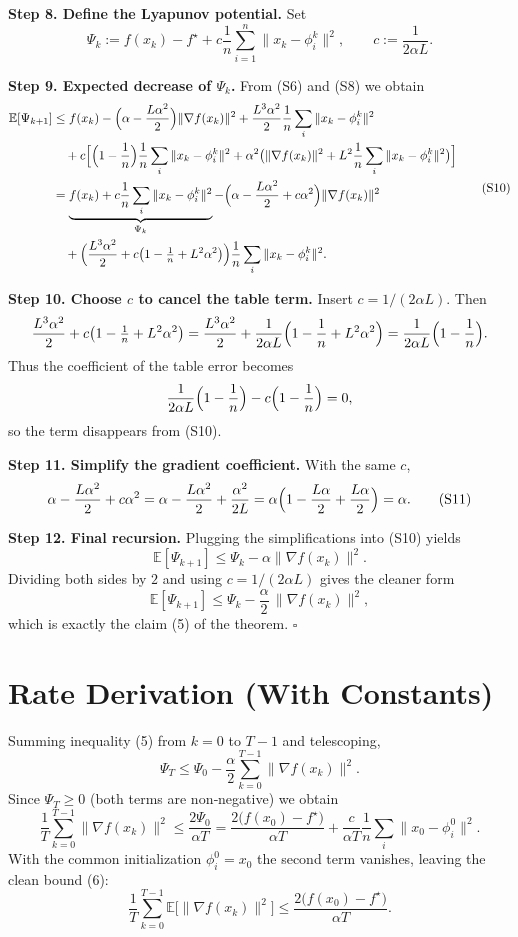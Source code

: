 \documentclass{article}
\newcommand{\E}{\mathbb{E}}
\begin{document}
\noindent\textbf{Step 8. Define the Lyapunov potential.}  
Set
\[
\Psi_k:= f(x_k)-f^{\star}
        +c\frac1n\sum_{i=1}^{n}\|x_k-\phi_i^{k}\|^{2},
\qquad c:=\frac{1}{2\alpha L}.
\tag{S9}
\]

\noindent\textbf{Step 9. Expected decrease of $\Psi_k$.}  
From (S6) and (S8) we obtain
\[
\begin{aligned}
\E[\Psi_{k+1}]
&\le f(x_k)-\Bigl(\alpha-\frac{L\alpha^{2}}{2}\Bigr)\|\nabla f(x_k)\|^{2}
   +\frac{L^{3}\alpha^{2}}{2}\frac1n\sum_{i}\|x_k-\phi_i^{k}\|^{2} \\
&\quad +c\Bigl[\Bigl(1-\frac1n\Bigr)\frac1n\sum_{i}\|x_k-\phi_i^{k}\|^{2}
        +\alpha^{2}\bigl(\|\nabla f(x_k)\|^{2}
        +L^{2}\frac1n\sum_{i}\|x_k-\phi_i^{k}\|^{2}\bigr)\Bigr] \\
&= \underbrace{f(x_k)+c\frac1n\sum_{i}\|x_k-\phi_i^{k}\|^{2}}_{\Psi_k}
   -\Bigl(\alpha-\frac{L\alpha^{2}}{2}+c\alpha^{2}\Bigr)\|\nabla f(x_k)\|^{2} \\
&\quad +\Bigl(\frac{L^{3}\alpha^{2}}{2}
          +c\bigl(1-\tfrac1n+L^{2}\alpha^{2}\bigr)\Bigr)
          \frac1n\sum_{i}\|x_k-\phi_i^{k}\|^{2}.
\end{aligned}
\tag{S10}
\]

\noindent\textbf{Step 10. Choose $c$ to cancel the table term.}  
Insert $c=1/(2\alpha L)$. Then
\[
\frac{L^{3}\alpha^{2}}{2}+c\bigl(1-\tfrac1n+L^{2}\alpha^{2}\bigr)
= \frac{L^{3}\alpha^{2}}{2}
   +\frac{1}{2\alpha L}\Bigl(1-\frac1n+L^{2}\alpha^{2}\Bigr)
= \frac{1}{2\alpha L}\Bigl(1-\frac1n\Bigr).
\]
Thus the coefficient of the table error becomes
\[
\frac{1}{2\alpha L}\Bigl(1-\frac1n\Bigr)
 - c\Bigl(1-\frac1n\Bigr)=0,
\]
so the term disappears from (S10). 

\noindent\textbf{Step 11. Simplify the gradient coefficient.}  
With the same $c$,
\[
\alpha-\frac{L\alpha^{2}}{2}+c\alpha^{2}
= \alpha-\frac{L\alpha^{2}}{2}+\frac{\alpha^{2}}{2L}
= \alpha\Bigl(1-\frac{L\alpha}{2}+\frac{L\alpha}{2}\Bigr)
= \alpha .
\tag{S11}
\]

\noindent\textbf{Step 12. Final recursion.}  
Plugging the simplifications into (S10) yields
\[
\E[\Psi_{k+1}]
\le \Psi_k-\alpha\|\nabla f(x_k)\|^{2}.
\tag{S12}
\]
Dividing both sides by $2$ and using $c=1/(2\alpha L)$ gives the cleaner form
\[
\E[\Psi_{k+1}]
\le \Psi_k-\frac{\alpha}{2}\,\|\nabla f(x_k)\|^{2},
\]
which is exactly the claim (5) of the theorem. $\square$

\section*{Rate Derivation (With Constants)}
Summing inequality (5) from $k=0$ to $T-1$ and telescoping,
\[
\Psi_T \le \Psi_0-\frac{\alpha}{2}\sum_{k=0}^{T-1}\|\nabla f(x_k)\|^{2}.
\]
Since $\Psi_T\ge 0$ (both terms are non‑negative) we obtain
\[
\frac{1}{T}\sum_{k=0}^{T-1}\|\nabla f(x_k)\|^{2}
\le \frac{2\Psi_0}{\alpha T}
= \frac{2\bigl(f(x_0)-f^{\star}\bigr)}{\alpha T}
   +\frac{c}{\alpha T}\frac1n\sum_{i}\|x_0-\phi_i^{0}\|^{2}.
\]
With the common initialization $\phi_i^{0}=x_0$ the second term vanishes,
leaving the clean bound (6):
\[
\frac{1}{T}\sum_{k=0}^{T-1}\E\!\bigl[\|\nabla f(x_k)\|^{2}\bigr]
   \le \frac{2\bigl(f(x_0)-f^{\star}\bigr)}{\alpha T}.
\]
\end{document}
